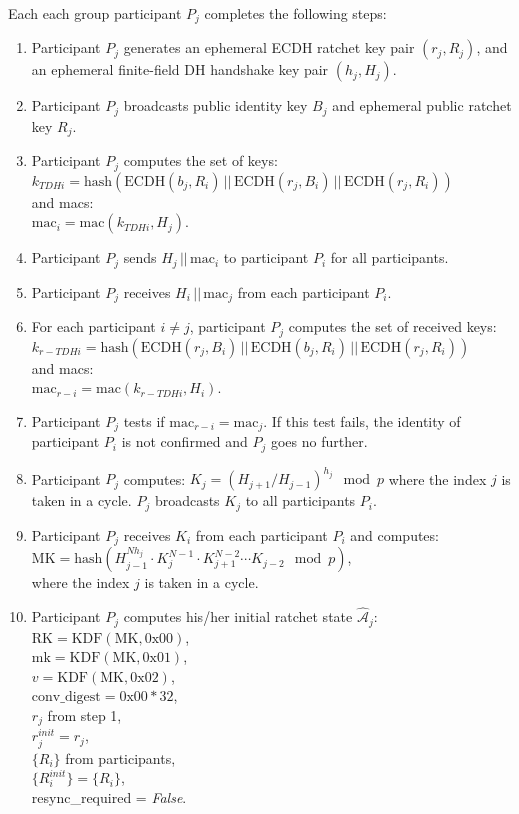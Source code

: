\documentclass[%
preprint,
amsmath,amssymb,
aps,
prb,
floatfix,
]{revtex4-1}
\begin{document}
Each each group participant $P_j$ completes the following steps:
\begin{enumerate}
\item Participant $P_j$ generates an ephemeral ECDH ratchet key pair $(r_j,
R_j)$, and an ephemeral finite-field DH handshake key pair $(h_j, H_j)$.
\item Participant $P_j$ broadcasts public identity key $B_j$ and ephemeral
public ratchet key $R_j$.
\item Participant $P_j$ computes the set of keys: \\ $k_{TDHi} =
\mathrm{hash}(\mathrm{ECDH}(b_j, R_i) \, ||
\, \mathrm{ECDH}(r_j, B_i) \, || \, \mathrm{ECDH}(r_j, R_i))$ \\ and macs: \\
$\mathrm{mac}_i = \mathrm{mac}(k_{TDHi}, H_j)$.
\item Participant $P_j$ sends $H_j \, || \, \mathrm{mac}_i$ to participant $P_i$ for all
participants.
\item Participant $P_j$ receives $H_i \, || \, \mathrm{mac}_j$ from each
participant $P_i$.
\item For each participant $i \ne j$, participant $P_j$ computes the set of received keys:\\ $k_{r-TDHi} =
\mathrm{hash}(\mathrm{ECDH}(r_j, B_i) \, ||
\, \mathrm{ECDH}(b_j, R_i) \, || \, \mathrm{ECDH}(r_j, R_i))$ \\ and macs: \\
$\mathrm{mac}_{r-i} = \mathrm{mac}(k_{r-TDHi}, H_i)$.
\item Participant $P_j$ tests if $\mathrm{mac}_{r-i} = \mathrm{mac}_j$. If this
test fails, the identity of participant $P_i$ is not confirmed and $P_j$ goes no
further.
\item Participant $P_j$ computes: $K_j = (H_{j+1}/H_{j-1})^{h_j} \mod p$ where the
index $j$ is taken in a cycle. $P_j$ broadcasts $K_j$ to all participants $P_i$.
\item Participant $P_j$ receives $K_i$ from each participant $P_i$ and
computes:\\ $\mathrm{MK} = \mathrm{hash}(H_{j-1}^{ N h_j} \cdot K_j^{N-1} \cdot
K_{j+1}^{N-2} \cdots K_{j-2} \mod p )$,\\
where the index $j$ is taken in a cycle.
\item Participant $P_j$ computes his/her initial ratchet state
$\mathcal{\hat{A}}_j$:\\
$\mathrm{RK} = \mathrm{KDF}(\mathrm{MK}, 0\mathrm{x}00)$, \\
$\mathrm{mk} = \mathrm{KDF}(\mathrm{MK}, 0\mathrm{x}01)$, \\
$v = \mathrm{KDF}(\mathrm{MK}, 0\mathrm{x}02)$, \\
$\mathrm{conv\_digest} = 0\mathrm{x}00 * 32$, \\
$r_j$ from step 1, \\
$r_j^{init} = r_j$, \\
$\{R_i\}$ from participants, \\
$\{R_i^{init}\} = \{R_i\}$, \\
resync\_required = \textit{False}.
\end{enumerate}
\end{document}
